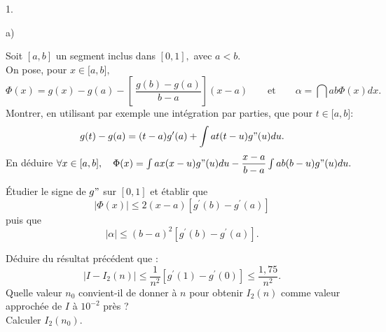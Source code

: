 \documentclass[11pt]{article}%
\begin{document}
\begin{noliste}{1.}
\begin{noliste}{a)}
\item Soit $[a,b]$ un segment inclus dans $[0,1],$ avec $a<b.$\\
On pose, pour $x\in \lbrack a,b],$
\[
\Phi (x) = g(x)-g(a)-\left[ \ \dfrac{g(b)-g(a)}{b-a}\right] (x-a)\qquad
\text{et}\qquad \alpha = \dint{a}{b}\Phi (x)dx.
\]
Montrer, en utilisant par exemple une intégration par parties, que pour
$t\in \lbrack a,b] :$
\[
g(t)-g(a) = (t-a)g^{\prime }(a) + \int{a}{t}(t-u)g"(u)du.
\]
En déduire $\forall x\in \lbrack a,b],\quad \Phi
(x) = \int{a}{x}(x-u)g"(u)du-\dfrac{x-a}{b-a}\int{a}{b}(b-u)g"(u)du.$

\item Étudier le signe de $g"$ sur $[0,1]$ et établir que 
\[
\left| \Phi (x)\right| \leq 2(x-a)\left[ g^{\prime
}(b)-g^{\prime }(a)\right] 
\]
puis que 
\[
\left| \alpha \right| \leq (b-a)^{2}\left[ g^{\prime
}(b)-g^{\prime }(a)\right].
\]

\item Déduire du résultat précédent que :
\[
\left| I-I_{2}(n)\right| \leq \dfrac{1}{n^{2}}\left[ g^{\prime
}(1)-g^{\prime }(0)\right] \leq \dfrac{1,75}{n^{2}}.
\]
Quelle valeur $n_{0}$ convient-il de donner à $n$ pour obtenir
$I_{2}(n)$
comme valeur approchée de $I$ à $10^{-2}$ près ?\\
Calculer $I_{2}(n_{0}).$
\end{noliste}
\end{noliste}

\label{fin}
\end{document}
